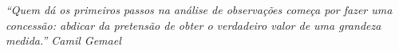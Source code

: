 \begin{epigrafe}
	\vspace*{\fill}
	\begin{flushright}
		\textit{“Quem dá os primeiros passos na análise de observações começa por fazer uma concessão: abdicar da pretensão de obter o verdadeiro valor de uma grandeza medida.” \newline
			Camil Gemael}
	\end{flushright}
\end{epigrafe}         